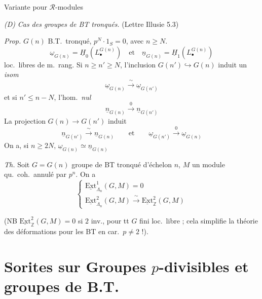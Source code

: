 \documentclass[11pt,a4paper]{article}
\begin{document}
Variante pour $\mathcal{R}$-modules

\emph{(D)} \emph{Cas des groupes de BT tronqués.}
(Lettre Illusie 5.3)

\emph{Prop.} $G(n)$ B.T.\ tronqué, $p^N \cdot 1_S = 0$, \struck{\ill{}} avec $n \geq N$.
\[
\underline{\omega}_{G(n)} = \underline{H}_0(L^{G(n)}_{\bullet}) \quad\text{et}\quad \underline{n}_{G(n)} = \underline{H}_1(L^{G(n)}_{\bullet})
\]
 loc.\ libres de m.\ rang. Si $n \geq n' \geq N$, l'inclusion $G(n') \hookrightarrow G(n)$ \struck{\ill{}} induit un \emph{isom}
\[
\underline{\omega}_{G(n)} \xrightarrow{\;\sim\;} \underline{\omega}_{G(n')}
\]
et si $n' \leq n - N$, l'hom.\ \emph{nul}
\[
\underline{n}_{G(n)} \xrightarrow{\;0\;} \underline{n}_{G(n')}
\]
La projection $G(n) \to G(n')$ induit
\[
\underline{n}_{G(n')} \xrightarrow{\;\sim\;} \underline{n}_{G(n)}
\qquad\text{et}\qquad
\underline{\omega}_{G(n')} \xrightarrow{\;0\;} \underline{\omega}_{G(n)}
\]
On a, si $n \geq 2N$, \quad $\underline{\omega}_{G(n)} \simeq \underline{n}_{G(n)}$

\emph{Th.} Soit $G = G(n)$ groupe de BT tronqué d'échelon $n$, $M$ un module qu.\ coh.\ annulé par $p^n$. On a
\[
\left\lbrace
\begin{array}{l}
\underline{\mathrm{Ext}}^1_{\Lambda_n}(G, M) = 0 \\
\underline{\mathrm{Ext}}^2_{\Lambda_n}(G, M) \xrightarrow{\;\sim\;} \underline{\mathrm{Ext}}^2_{\mathbb{Z}}(G, M)
\end{array}
\right.
\]

(NB $\underline{\mathrm{Ext}}^2_{\mathbb{Z}}(G, M) = 0$ si $2$ inv., pour tt $G$ fini loc.\ libre ; cela simplifie la théorie des déformations pour les BT en car.\ $p \neq 2$ !).

\section*{Sorites sur Groupes $p$-divisibles et groupes de B.T.}
\end{document}
